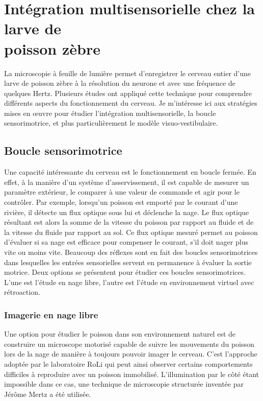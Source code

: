 \section[Chez la larve de poisson zèbre]{Intégration multisensorielle chez la larve de \\ poisson zèbre}

La microscopie à feuille de lumière permet d'enregistrer le cerveau entier d'une larve de poisson zèbre à la résolution du neurone et avec une fréquence de quelques Hertz. Plusieurs études ont appliqué cette technique pour comprendre différents aspects du fonctionnement du cerveau. Je m'intéresse ici aux stratégies mises en œuvre pour étudier l'intégration multisensorielle, la boucle sensorimotrice, et plus particulièrement le modèle visuo-vestibulaire.


\subsection{Boucle sensorimotrice}

Une capacité intéressante du cerveau est le fonctionnement en boucle fermée. En effet, à la manière d'un système d'asservissement, il est capable de mesurer un paramètre extérieur, le comparer à une valeur de commande et agir pour le contrôler. Par exemple, lorsqu'un poisson est emporté par le courant d'une rivière, il détecte un flux optique sous lui et déclenche la nage. Le flux optique résultant est alors la somme de la vitesse du poisson par rapport au fluide et de la vitesse du fluide par rapport au sol. Ce flux optique mesuré permet au poisson d'évaluer si sa nage est efficace pour compenser le courant, s'il doit nager plus vite ou moins vite. Beaucoup des réflexes sont en fait des boucles sensorimotrices dans lesquelles les entrées sensorielles servent en permanence à évaluer la sortie motrice. Deux options se présentent pour étudier ces boucles sensorimotrices. L'une est l'étude en nage libre, l'autre est l'étude en environnement virtuel avec rétroaction.

\subsubsection{Imagerie en nage libre}

Une option pour étudier le poisson dans son environnement naturel est de construire un microscope motorisé capable de suivre les mouvements du poisson lors de la nage de manière à toujours pouvoir imager le cerveau. C'est l'approche adoptée par le laboratoire RoLi \cite{kim_pan-neuronal_2017} qui peut ainsi observer certains comportements difficiles à reproduire avec un poisson immobilisé. L'illumination par le côté étant impossible dans ce cas, une technique de microscopie structurée inventée par Jérôme Mertz \cite{mertz_optical_2011} a été utilisée.

